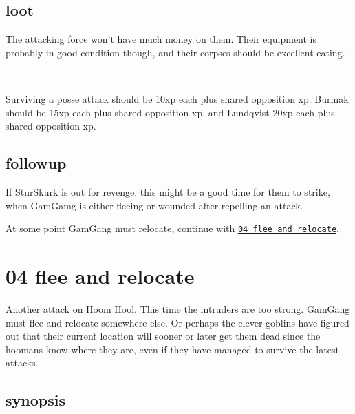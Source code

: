 \subsection*{loot}

The attacking force won't have much money on them. Their equipment is probably in good condition though, and their corpses should be excellent eating.

\

Surviving a posse attack should be 10xp each plus shared opposition xp. Burmak should be 15xp each plus shared opposition xp, and Lundqvist 20xp each plus shared opposition xp.


\subsection*{followup}

If SturSkurk is out for revenge, this might be a good time for them to strike, when GamGamg is either fleeing or wounded after repelling an attack.

At some point GamGang must relocate, continue with 
\hyperref[04fleeandrelocate]{\texttt{04 flee and relocate}}.












\clearpage
\section*{04 flee and relocate}
\label{04fleeandrelocate}

Another attack on Hoom Hool. This time the intruders are too strong. GamGang must flee and relocate somewhere else. Or perhaps the clever goblins have figured out that their current location will sooner or later get them dead since the hoomans know where they are, even if they have managed to survive the latest attacks.


\subsection*{synopsis}


